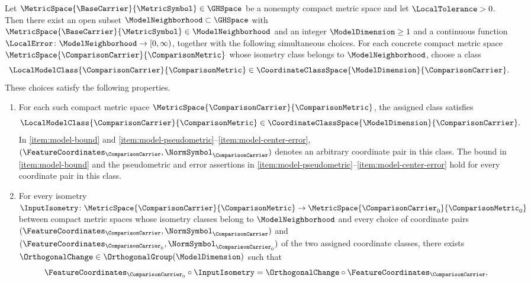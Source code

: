 \begin{theorem}\label{thm:local-models}
Let
$\MetricSpace{\BaseCarrier }{\MetricSymbol }\in\GHSpace$
be a nonempty compact metric space and let
$\LocalTolerance >0$.
Then there exist an open subset
$\ModelNeighborhood\subset\GHSpace$
with
$\MetricSpace{\BaseCarrier }{\MetricSymbol }\in\ModelNeighborhood$
and an integer
$\ModelDimension \geq1$
and a continuous function
$\LocalError\colon\ModelNeighborhood\to[0,\infty)$,
together with the following simultaneous choices.
For each concrete compact metric space
$\MetricSpace{\ComparisonCarrier}{\ComparisonMetric}$
whose isometry class belongs to
$\ModelNeighborhood$,
choose a class
\[
 \LocalModelClass{\ComparisonCarrier}{\ComparisonMetric}
 \in\CoordinateClassSpace{\ModelDimension}{\ComparisonCarrier}.
\]
These choices satisfy the following properties.
\begin{enumerate}[label=\textup{(A\arabic*)},ref=\textup{(A\arabic*)}]
\item\label{item:model-class}
For each such compact metric space
$\MetricSpace{\ComparisonCarrier}{\ComparisonMetric}$,
the assigned class satisfies
\[
 \LocalModelClass{\ComparisonCarrier}{\ComparisonMetric}
 \in\CoordinateClassSpace{\ModelDimension}{\ComparisonCarrier}.
\]
In \ref{item:model-bound} and \ref{item:model-pseudometric}--\ref{item:model-center-error},
$(\FeatureCoordinates_\ComparisonCarrier,\NormSymbol_\ComparisonCarrier)$
denotes an arbitrary coordinate pair in this class.
The bound in \ref{item:model-bound} and the pseudometric and error assertions
in \ref{item:model-pseudometric}--\ref{item:model-center-error} hold for every coordinate pair in this class.
\item\label{item:model-equivariance}
For every isometry
$\InputIsometry\colon\MetricSpace{\ComparisonCarrier}{\ComparisonMetric}
 \to\MetricSpace{\ComparisonCarrier_0}{\ComparisonMetric_0}$
between compact metric spaces whose isometry classes belong to
$\ModelNeighborhood$
and every choice of coordinate pairs
$(\FeatureCoordinates_\ComparisonCarrier,\NormSymbol_\ComparisonCarrier)$
and
$(\FeatureCoordinates_{\ComparisonCarrier_0},\NormSymbol_{\ComparisonCarrier_0})$
of the two assigned coordinate classes,
there exists
$\OrthogonalChange\in\OrthogonalGroup(\ModelDimension)$
such that
\begin{equation}\label{eq:input-isometry-1}
 \FeatureCoordinates_{\ComparisonCarrier_0}\circ\InputIsometry
 =\OrthogonalChange\circ\FeatureCoordinates_\ComparisonCarrier,
\end{equation}

\end{enumerate}
\end{theorem}
